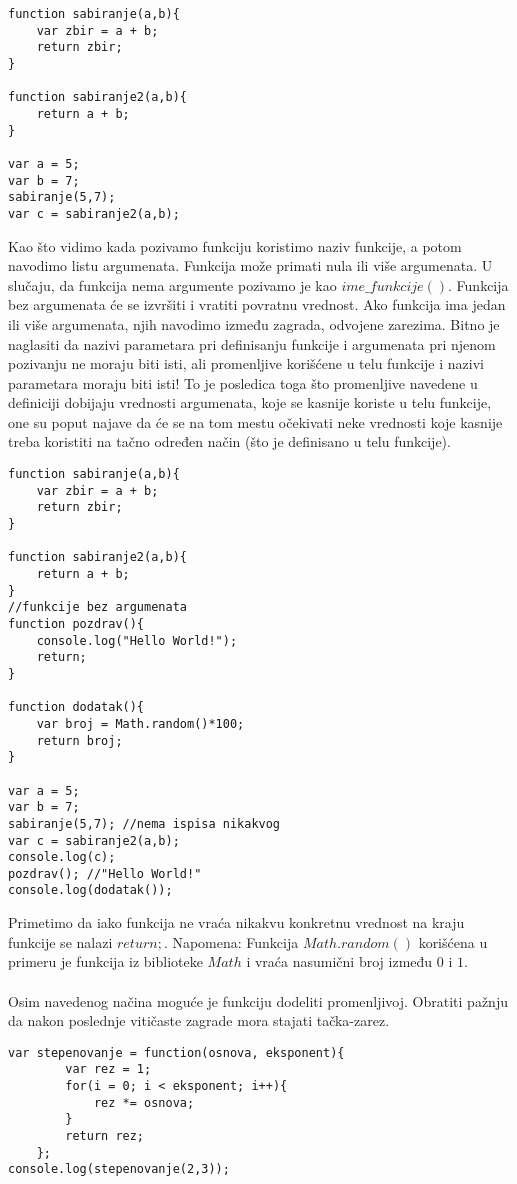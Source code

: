 \begin{lstlisting}[backgroundcolor = \color{lightgray}, breaklines=true]
function sabiranje(a,b){
	var zbir = a + b;
	return zbir;
}

function sabiranje2(a,b){
	return a + b;
}

var a = 5;
var b = 7;
sabiranje(5,7);
var c = sabiranje2(a,b);
\end{lstlisting}

Kao što vidimo kada pozivamo funkciju koristimo naziv funkcije, a potom navodimo listu argumenata. Funkcija može primati nula ili više argumenata. U slučaju, da funkcija nema argumente pozivamo je kao $ime\_funkcije()$. Funkcija bez argumenata će se izvršiti i vratiti povratnu vrednost. Ako funkcija ima jedan ili više argumenata, njih navodimo između zagrada, odvojene zarezima. Bitno je naglasiti da nazivi parametara pri definisanju funkcije i argumenata pri njenom pozivanju ne moraju biti isti, ali promenljive korišćene u telu funkcije i nazivi parametara moraju biti isti! To je posledica toga što promenljive navedene u definiciji dobijaju vrednosti argumenata, koje se kasnije koriste u telu funkcije, one su poput najave da će se na tom mestu očekivati neke vrednosti koje kasnije treba koristiti na tačno određen način (što je definisano u telu funkcije).  

\begin{lstlisting}[backgroundcolor = \color{lightgray}, breaklines=true]
function sabiranje(a,b){
	var zbir = a + b;
	return zbir;
}

function sabiranje2(a,b){
	return a + b;
}
//funkcije bez argumenata
function pozdrav(){
	console.log("Hello World!");
	return;
}

function dodatak(){
	var broj = Math.random()*100;
	return broj;
}

var a = 5;
var b = 7;
sabiranje(5,7); //nema ispisa nikakvog
var c = sabiranje2(a,b); 
console.log(c);
pozdrav(); //"Hello World!"
console.log(dodatak());
\end{lstlisting}
Primetimo da iako funkcija ne vraća nikakvu konkretnu vrednost na kraju funkcije se nalazi $return;$.
Napomena: Funkcija $Math.random()$ korišćena u primeru je funkcija iz biblioteke $Math$ i vraća nasumični broj između $0$ i $1$. \\\\

Osim navedenog načina moguće je funkciju dodeliti promenljivoj. Obratiti pažnju da nakon poslednje vitičaste zagrade mora stajati tačka-zarez. 
\begin{lstlisting}[backgroundcolor = \color{lightgray}, breaklines=true]
var stepenovanje = function(osnova, eksponent){
		var rez = 1;
        for(i = 0; i < eksponent; i++){
        	rez *= osnova;
        }
        return rez;
	};
console.log(stepenovanje(2,3));
\end{lstlisting}


